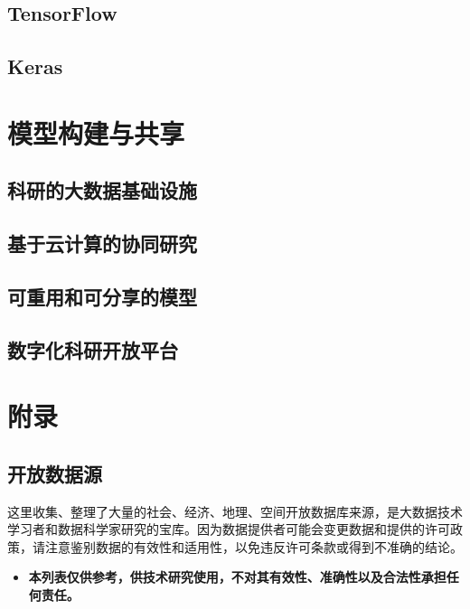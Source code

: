 \documentclass[letterpaper,10pt,english]{sphinxmanual}
\begin{document}
\subsection{TensorFlow}
\label{gispark_ml:TensorFlow}

\subsection{Keras}
\label{gispark_ml:Keras}

\section{模型构建与共享}
\label{gispark_science:_u6a21_u578b_u6784_u5efa_u4e0e_u5171_u4eab}\label{gispark_science::doc}

\subsection{科研的大数据基础设施}
\label{gispark_science:_u79d1_u7814_u7684_u5927_u6570_u636e_u57fa_u7840_u8bbe_u65bd}

\subsection{基于云计算的协同研究}
\label{gispark_science:_u57fa_u4e8e_u4e91_u8ba1_u7b97_u7684_u534f_u540c_u7814_u7a76}

\subsection{可重用和可分享的模型}
\label{gispark_science:_u53ef_u91cd_u7528_u548c_u53ef_u5206_u4eab_u7684_u6a21_u578b}

\subsection{数字化科研开放平台}
\label{gispark_science:_u6570_u5b57_u5316_u79d1_u7814_u5f00_u653e_u5e73_u53f0}

\section{附录}
\label{gispark_appendix:_u9644_u5f55}\label{gispark_appendix::doc}

\subsection{开放数据源}
\label{opendatasource:}\label{opendatasource:id1}\label{opendatasource::doc}
这里收集、整理了大量的社会、经济、地理、空间开放数据库来源，是大数据技术学习者和数据科学家研究的宝库。因为数据提供者可能会变更数据和提供的许可政策，请注意鉴别数据的有效性和适用性，以免违反许可条款或得到不准确的结论。
\begin{itemize}
\item {} 
\textbf{本列表仅供参考，供技术研究使用，不对其有效性、准确性以及合法性承担任何责任。}

\end{itemize}
\end{document}
